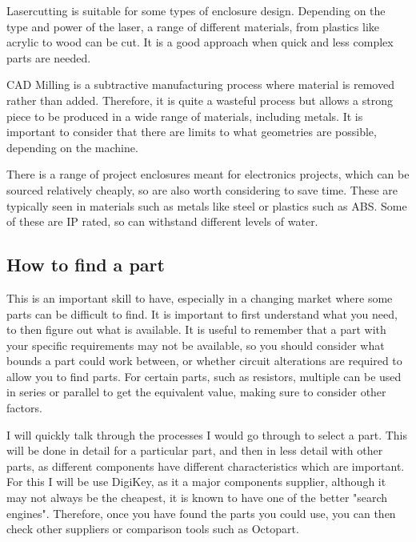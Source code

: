 \documentclass[a4paper,11pt]{report}
\begin{document}
Lasercutting is suitable for some types of enclosure design. Depending on the type and power of the laser, a range of different materials, from plastics like acrylic to wood can be cut. It is a good approach when quick and less complex parts are needed.

CAD Milling is a subtractive manufacturing process where material is removed rather than added. Therefore, it is quite a wasteful process but allows a strong piece to be produced in a wide range of materials, including metals. It is important to consider that there are limits to what geometries are possible, depending on the machine.

There is a range of project enclosures meant for electronics projects, which can be sourced relatively cheaply, so are also worth considering to save time. These are typically seen in materials such as metals like steel or plastics such as ABS. Some of these are IP rated, so can withstand different levels of water.

\subsection{How to find a part}

This is an important skill to have, especially in a changing market where some parts can be difficult to find. It is important to first understand what you need, to then figure out what is available. It is useful to remember that a part with your specific requirements may not be available, so you should consider what bounds a part could work between, or whether circuit alterations are required to allow you to find parts. For certain parts, such as resistors, multiple can be used in series or parallel to get the equivalent value, making sure to consider other factors.

I will quickly talk through the processes I would go through to select a part. This will be done in detail for a particular part, and then in less detail with other parts, as different components have different characteristics which are important. For this I will be use DigiKey, as it a major components supplier, although it may not always be the cheapest, it is known to have one of the better "search engines". Therefore, once you have found the parts you could use, you can then check other suppliers or comparison tools such as Octopart.
\end{document}

